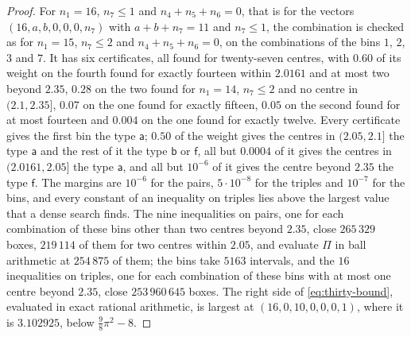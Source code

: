 \documentclass[11pt,reqno]{amsart}
\renewcommand{\_}{\origunderscore\allowbreak}
\numberwithin{equation}{section}
\theoremstyle{plain}
\theoremstyle{definition}
\theoremstyle{remark}
\begin{document}
\begin{proof}
For $n_1=16$, $n_7\le1$ and $n_4+n_5+n_6=0$, that is for the vectors
$(16,a,b,0,0,0,n_7)$ with $a+b+n_7=11$ and $n_7\le1$, the combination is
checked as for $n_1=15$, $n_7\le2$ and $n_4+n_5+n_6=0$, on the
combinations of the bins $1$, $2$, $3$ and $7$. It has six certificates,
all found for twenty-seven centres, with $0.60$ of its weight on the
fourth found for exactly fourteen within $2.0161$ and at most two beyond
$2.35$, $0.28$ on the two found for $n_1=14$, $n_7\le2$ and no centre in
$(2.1,2.35]$, $0.07$ on the one found for exactly fifteen, $0.05$ on
the second found for at most fourteen and $0.004$ on the one found for
exactly twelve. Every certificate gives the first
bin the type $\mathsf a$; $0.50$ of the weight gives the centres in
$(2.05,2.1]$ the type $\mathsf a$ and the rest of it the type $\mathsf b$
or $\mathsf f$, all but $0.0004$ of it gives the centres in
$(2.0161,2.05]$ the type $\mathsf a$, and all but $10^{-6}$ of it gives
the centre beyond $2.35$ the type $\mathsf f$. The margins are $10^{-6}$
for the pairs, $5\cdot10^{-8}$ for the triples and $10^{-7}$ for the bins,
and every constant of an inequality on triples lies above the largest
value that a dense search finds. The nine inequalities on pairs, one for
each combination of these bins other than two centres beyond $2.35$, close
$265\,329$ boxes, $219\,114$ of them for two centres within $2.05$, and
evaluate $\Pi$ in ball arithmetic at $254\,875$ of them; the bins take
$5163$ intervals, and the $16$ inequalities on triples, one for each
combination of these bins with at most one centre beyond $2.35$, close
$253\,960\,645$ boxes. The right side of \eqref{eq:thirty-bound},
evaluated in exact rational arithmetic, is largest at $(16,0,10,0,0,0,1)$,
where it is $3.102925$, below $\frac98\pi^2-8$.


\end{proof}
\end{document}
